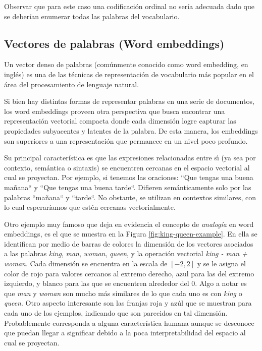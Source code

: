 Observar que para este caso una codificación ordinal no sería adecuada dado que
se deberían enumerar todas las palabras del vocabulario.

\subsection{Vectores de palabras (Word embeddings)}
\label{method:wb}

Un vector denso de palabras (comúnmente conocido como word embedding, en inglés)
es una de las técnicas de representación de vocabulario más popular en el área
del procesamiento de lenguaje natural.

Si bien hay distintas formas de representar palabras en una serie de documentos,
los word embeddings proveen otra perspectiva que busca encontrar una
representación vectorial compacta donde cada dimensión logre capturar las
propiedades subyacentes y latentes de la palabra. De esta manera, los embeddings
son superiores a una representación que permanece en un nivel poco profundo.

Su principal característica  es que las expresiones relacionadas entre sı́ (ya
sea por contexto, semántica o sintaxis) se encuentren cercanas en el espacio
vectorial al cual se proyectan. Por ejemplo, si tenemos las oraciones: ``Que
tengas una buena mañana`` y ``Que tengas una buena tarde``. Difieren
semánticamente solo por las palabras ``mañana`` y ``tarde``. No obstante, se
utilizan en contextos similares, con lo cual esperaríamos que estén cercanas
vectorialmente.

Otro ejemplo muy famoso que deja en evidencia el concepto de \emph{analogía} en
word embeddings, es el que se muestra en la Figura \ref{fig:king-queen-example}.
En ella se identifican por medio de barras de colores la dimensión de los
vectores asociados a las palabras \emph{king}, \emph{man}, \emph{woman},
\emph{queen}, y la operación vectorial \emph{king - man + woman}. Cada dimensión
se encuentra en la escala de $[-2, 2]$ y se le asigna el color de rojo para
valores cercanos al extremo derecho, azul para las del extremo izquierdo, y
blanco para las que se encuentren alrededor del 0.  Algo a notar es que
\emph{man} y \emph{woman} son mucho más similares de lo que cada uno es con
\emph{king} o \emph{queen}. Otro aspecto interesante son las franjas roja y azúl
que se muestran para cada uno de los ejemplos, indicando que son parecidos en
tal dimensión. Probablemente corresponda a alguna característica humana aunque
se desconoce que puedan llegar a significar debido a la poca interpretabilidad
del espacio al cual se proyectan.

